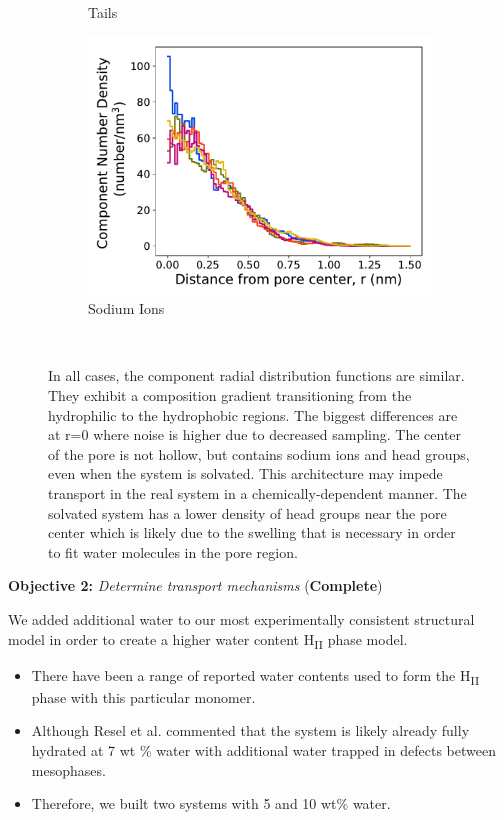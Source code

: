 \documentclass{article}
\begin{document}
\begin{figure}[!htb]
\begin{subfigure}{0.32\textwidth}
        \caption{Tails}
        \label{fig:tails_regional_density}
  \end{subfigure}
  \begin{subfigure}{0.32\textwidth}
        \includegraphics[width=1\linewidth]{sodium_density.pdf}
        \caption{Sodium Ions}
        \label{fig:sodium_regional_density}
  \end{subfigure}
  \caption{In all cases, the component radial distribution functions are similar.
      They exhibit a composition gradient transitioning from the hydrophilic to the hydrophobic
          regions. The biggest differences are at r=0 where noise is higher due to
          decreased sampling. The center of the pore is not hollow, but contains sodium ions and
          head groups, even when the system is solvated. This architecture may impede transport in
          the real system in a chemically-dependent manner.
          The solvated system has a lower density of head groups near the
          pore center which is likely due to the swelling that is necessary in order to fit water
          molecules in the pore region.}~\label{fig:overlaid_densities}
  \end{figure}
  
  \noindent \textbf{\large Objective 2:} \textit{\large Determine transport mechanisms} (\textcolor{green!40!olive}{\textbf{Complete}})
  
  \noindent We added additional water to our most experimentally consistent
  structural model in order to create a higher water content H\textsubscript{II}
  phase model.
  \begin{itemize}
    \item There have been a range of reported water contents used to 
    form the H\textsubscript{II} phase with this particular monomer.
    \item Although Resel et al. commented that the system is likely
    already fully hydrated at 7 wt \% water with additional water
    trapped in defects between mesophases.\cite{resel_structural_2000}
    \item Therefore, we built two systems with 5 and 10 wt\% water.
  \end{itemize}
  
\end{document}
